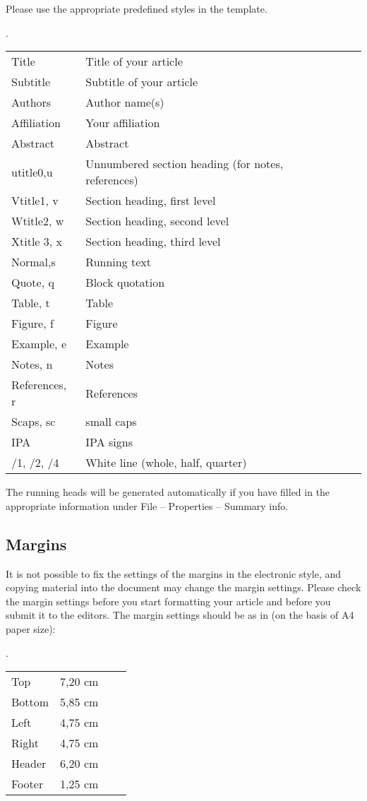 \documentclass[times,linguex]{lsb}
\begin{document}
Please use the appropriate predefined styles in the template.

\ex. \begin{tabular}[t]{llll@{\hskip 36pt}}
Title			& Title of your article\\
Subtitle		& Subtitle of your article\\
Authors		& Author name(s)\\
Affiliation	& Your affiliation\\
Abstract	& 	Abstract\\
utitle0,u	& 	Unnumbered section heading (for notes, references)\\
Vtitle1, v	& 	Section heading, first level\\
Wtitle2, w	& 	Section heading, second level\\
Xtitle 3, x	& 	Section heading, third level\\
Normal,s & Running text \\
Quote, q	& 	Block quotation\\
Table, t	& 	Table\\
Figure, f	& 	Figure\\
Example, e	& 	Example\\
Notes, n	& 	Notes\\
References, r	& 	References\\
Scaps, sc	& 	small caps\\
IPA		& 	IPA signs \\
/1, /2, /4	& 	White line (whole, half, quarter)   \\
\end{tabular}

The running heads will be generated automatically if you have filled in the appropriate information under File – Properties – Summary info.


\subsection{Margins}

It is not possible to fix the settings of the margins in the electronic style, and copying material into the document may change the margin settings. Please check the margin settings before you start formatting your article and before you submit it to the editors. The margin settings should be as in \Next  (on the basis of A4 paper size):

\ex. \begin{tabular}[t]{llll@{\hskip 36pt}}
Top 	&	7,20 cm\\
Bottom &	5,85 cm\\
Left 	&	4,75 cm\\
Right &		4,75 cm\\
Header &	6,20 cm\\
Footer 	&	1,25 cm\\
\end{tabular}
\end{document}
